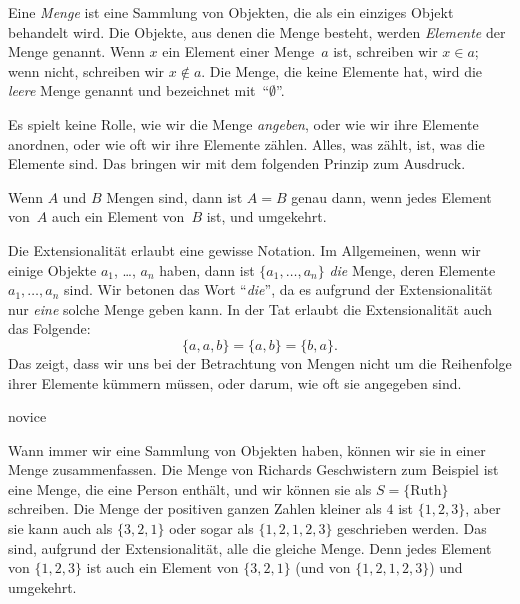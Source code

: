 \documentclass[../../../include/open-logic-section]{subfiles}
\begin{document}

Eine \emph{Menge} ist eine Sammlung von Objekten, die als ein einziges
Objekt behandelt wird. Die Objekte, aus denen die Menge besteht, werden \emph{Elemente} der Menge genannt. Wenn $x$ ein Element 
einer Menge~$a$ ist, schreiben wir $x \in a$; wenn nicht, schreiben wir $x \notin a$. Die Menge, die keine
Elemente hat, wird die \emph{leere} Menge genannt und
bezeichnet mit~``$\emptyset$''.

\begin{explain}
Es spielt keine Rolle, wie wir die Menge \emph{angeben}, oder wie wir
ihre Elemente anordnen, oder wie oft wir ihre Elemente zählen. Alles, was zählt, ist, was die Elemente
sind. Das bringen wir mit dem folgenden Prinzip zum Ausdruck.
\end{explain}

\begin{defn}[Extensionalität]
  Wenn $A$ und $B$ Mengen sind, dann ist $A = B$ genau dann, wenn
  jedes Element von~$A$ auch ein Element von~$B$ ist, und umgekehrt.
\end{defn}

Die Extensionalität erlaubt eine gewisse Notation. Im Allgemeinen, wenn wir einige
Objekte $a_{1}$, \dots, $a_{n}$ haben, dann ist $\{a_{1}, \dots, a_{n}\}$
\emph{die} Menge, deren Elemente $a_1, \dots, a_n$ sind. Wir betonen das Wort ``\emph{die}'', da es aufgrund der Extensionalität
nur \emph{eine} solche Menge geben kann. In der Tat erlaubt die Extensionalität auch das
Folgende:
  \[
    \{a, a, b\} = \{a, b\} = \{b,a\}.
  \] 
Das zeigt, dass wir uns bei der Betrachtung von Mengen nicht um die Reihenfolge ihrer Elemente kümmern müssen, 
oder darum, wie oft sie angegeben sind.

\begin{tagblock}{novice}
\begin{ex}
Wann immer wir eine Sammlung von Objekten haben, können wir sie in einer Menge zusammenfassen.
 Die Menge von Richards Geschwistern zum Beispiel ist eine Menge, die
eine Person enthält, und wir können sie als $S=\{\textrm{Ruth}\}$ schreiben.
Die Menge der positiven ganzen Zahlen kleiner als $4$ ist $\{1, 2, 3\}$, aber sie
kann auch als $\{3, 2, 1\}$ oder sogar als $\{1, 2, 1, 2, 3\}$ geschrieben werden.
Das sind, aufgrund der Extensionalität, alle die gleiche Menge. Denn jedes Element
von $\{1, 2, 3\}$ ist auch ein Element von $\{3, 2, 1\}$ (und von $\{1,
2, 1, 2, 3\}$) und umgekehrt.
\end{ex} 
\end{tagblock}
\end{document}
